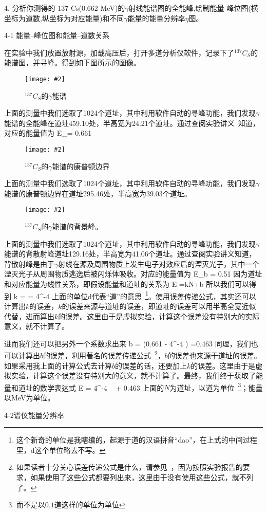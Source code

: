 \documentclass[11pt,a4paper]{ctexart}
\newcommand{\cpic}[2]{
\begin{center}
\texttt{[image: \#2]}
\end{center}
}
\newcommand{\cpicn}[3]
{
\begin{figure}[H]
\cpic{#1}{#2}
\caption{\color{red}#3\label{#2}}
\end{figure}
}
\begin{document}
4. 分析你测得的 137 Cs(0.662 MeV)的$\gamma$射线能谱图的全能峰,绘制能量-峰位图(横坐标为道数,纵坐标为对应能量)和不同$\gamma$能量的能量分辨率$\eta$图。

4-1 能量--峰位图和能量--道数关系

在实验中我们放置放射源，加载高压后，打开多道分析仪软件，记录下了$^{137}C_S$的能谱图，并寻峰。得到如下图所示的图像。
\cpicn{0.4}{gamma137Cs}{$^{137}C_S$的$\gamma$能谱}
上面的测量中我们选取了1024个道址，其中利用软件自动的寻峰功能，我们发现$\gamma$能谱的全能峰在道址459.10处，半高宽为24.21个道址。通过查阅实验讲义~\cite{lec}知道，对应的能量值为
\beq
E_\gamma = 0.661 
\eeq
\cpicn{0.4}{gamma_peak2}{$^{137}C_S$的$\gamma$能谱的康普顿边界}
上面的测量中我们选取了1024个道址，其中利用软件自动的寻峰功能，我们发现$\gamma$能谱的康普顿边界在道址295.46处，半高宽为39.03个道址。
\cpicn{0.4}{gamma_peak1}{$^{137}C_S$的$\gamma$能谱的背景峰。}
上面的测量中我们选取了1024个道址，其中利用软件自动的寻峰功能，我们发现$\gamma$能谱的背散射峰道址129.16处，半高宽为41.06个道址。通过查阅实验讲义知道，背散射峰是由于$\gamma$射线在源及周围物质上发生电子对效应后的湮灭光子，其中一个湮灭光子从周围物质逃逸后被闪烁体吸收。对应的能量值为
\beq
E_b = 0.51
\eeq
因为道址和对应能量为线性关系，即假设能量和道址的关系为
\beq
E =kN+b
\eeq
所以我们可以得到
\beq
k =  = 4^{-4}
\eeq
上面的单位d代表“道”的意思~\footnote{这个新奇的单位是我瞎编的，起源于道的汉语拼音“dao”，在上式的中间过程里，d这个单位略去不写。}。使用误差传递公式，其实还可以计算出$k$的误差，$k$的误差来源与道址的误差，即道址的误差可以用半高全宽近似代替，进而算出$k$的误差。这里由于是虚拟实验，计算这个误差没有特别大的实际意义，就不计算了。

进而我们还可以把另外一个系数求出来
\beq
b = \left(0.661 - 4^{-4} \right) =0.463
\eeq
同理，我们也可以计算出$b$的误差，利用著名的误差传递公式~\footnote{如果读者十分关心误差传递公式是什么，请参见~\cite{error}，因为按照实验报告的要求，如果使用了这些公式都要列出来，这里由于没有使用这些公式，就不列了。}，$b$的误差也来源于道址的误差。如果采用我上面的计算公式去计算$b$的误差的话，还要加上$k$的误差。这里由于是虚拟实验，计算这个误差没有特别大的意义，就不计算了。最终，我们终于获取了{\color{red}能量和道址的数学表达式}
\beq
E = 4^{-4} \,\,\, + 0.463
\eeq
上面的$N$为道址，以道为单位~\footnote{而不是以$0.1$道这样的单位为单位}；能量以MeV为单位。

4-2谱仪能量分辨率
\end{document}
